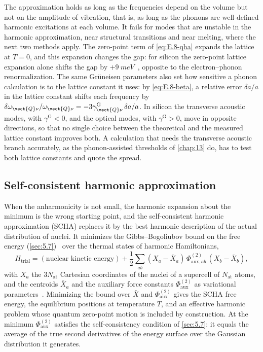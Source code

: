 The approximation holds as long as the frequencies depend on the volume but not on the amplitude of vibration, that is, as long as the phonons are well-defined harmonic excitations at each volume. It fails for modes that are unstable in the harmonic approximation, near structural transitions and near melting, where the next two methods apply. The zero-point term of \cref{eq:E.8-qha} expands the lattice at $T = 0$, and this expansion changes the gap: for silicon the zero-point lattice expansion alone shifts the gap by $+\SI{9}{meV}$~\cite[Table~S2]{miglio2020predominance}, opposite to the electron--phonon renormalization. The same Grüneisen parameters also set how sensitive a phonon calculation is to the lattice constant it uses: by \cref{eq:E.8-beta}, a relative error $\delta a/a$ in the lattice constant shifts each frequency by $\delta\omega_{\vect{Q}\nu}/\omega_{\vect{Q}\nu} = -3\gamma^{\mathrm{G}}_{\vect{Q}\nu}\,\delta a/a$. In silicon the transverse acoustic modes, with $\gamma^{\mathrm{G}} < 0$, and the optical modes, with $\gamma^{\mathrm{G}} > 0$, move in opposite directions, so that no single choice between the theoretical and the measured lattice constant improves both. A calculation that needs the transverse acoustic branch accurately, as the phonon-assisted thresholds of \cref{chap:13} do, has to test both lattice constants and quote the spread.

\subsection{Self-consistent harmonic approximation}

When the anharmonicity is not small, the harmonic expansion about the minimum is the wrong starting point, and the self-consistent harmonic approximation (SCHA) replaces it by the best harmonic description of the actual distribution of nuclei. It minimizes the Gibbs--Bogoliubov bound on the free energy (\cref{sec:5.7})~\cite[Eq.~(2)]{monacelli2021stochastic} over the thermal states of harmonic Hamiltonians,
\begin{equation}
  H_{\mathrm{trial}} = (\text{nuclear kinetic energy}) + \frac12\sum_{ab}(X_a - \bar X_a)\,\Phi^{(2)}_{\mathrm{aux},ab}\,(X_b - \bar X_b) ,
  \label{eq:E.8-scha}
\end{equation}
with $X_a$ the $3N_{\mathrm{at}}$ Cartesian coordinates of the nuclei of a supercell of $N_{\mathrm{at}}$ atoms, and the centroids $\bar X_a$ and the auxiliary force constants $\Phi^{(2)}_{\mathrm{aux}}$ as variational parameters~\cite[Eqs.~(4) and~(7)]{monacelli2021stochastic}. Minimizing the bound over $\bar X$ and $\Phi^{(2)}_{\mathrm{aux}}$ gives the SCHA free energy, the equilibrium positions at temperature $T$, and an effective harmonic problem whose quantum zero-point motion is included by construction. At the minimum $\Phi^{(2)}_{\mathrm{aux}}$ satisfies the self-consistency condition of \cref{sec:5.7}: it equals the average of the true second derivatives of the energy surface over the Gaussian distribution it generates.

